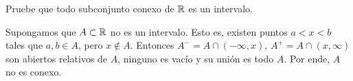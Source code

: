 \begin{exercise}
Pruebe que todo subconjunto conexo de $\mathbb R$ es un intervalo.
\end{exercise}

\begin{solution}
Supongamos que $A \subset \mathbb R$ no es un intervalo. Esto es, existen puntos $a < x < b$ tales que $a, b \in A$, pero $x \notin A$. Entonces $A^- = A \cap (-\infty, x)$, $A^+ = A \cap (x, \infty)$ son abiertos relativos de $A$, ninguno es vacío y su unión es todo $A$. Por ende, $A$ no es conexo.
\end{solution}
